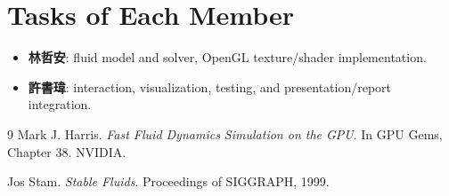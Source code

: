 \documentclass[10pt,a4paper]{article}
\begin{document}
\section{Tasks of Each Member}
\begin{itemize}
    \item \textbf{林哲安}: fluid model and solver, OpenGL texture/shader implementation.
    \item \textbf{許書瑋}: interaction, visualization, testing, and presentation/report integration.
\end{itemize}

\begin{thebibliography}{9}
Mark J. Harris. \textit{Fast Fluid Dynamics Simulation on the GPU}. In GPU Gems, Chapter 38. NVIDIA.

Jos Stam. \textit{Stable Fluids}. Proceedings of SIGGRAPH, 1999.
\end{thebibliography}
\end{document}
